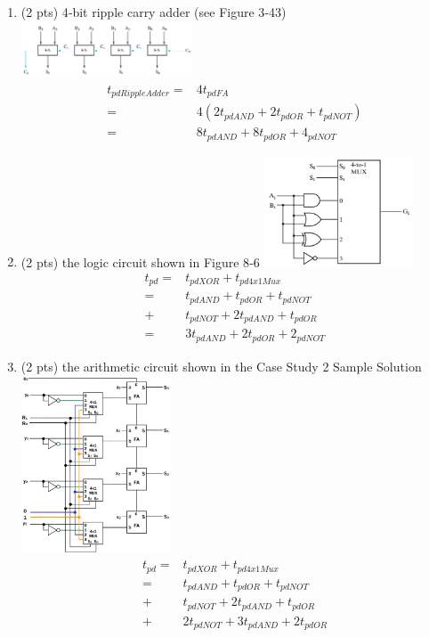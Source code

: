 \documentclass[12pt,letterpaper,titlepage]{report}
\begin{document}
\begin{raggedright}
\begin{multicols}{2}
\begin{enumerate} [label=\alph*)]
\item (2 pts) 4‐bit ripple carry adder (see Figure 3‐43) 
\includegraphics[width=0.4\textwidth,height=0.9\textheight,keepaspectratio=true]{hw8p1c}
\begin{align*}
t_{pdRippleAdder}=& 4t_{pdFA}
               \\=& 4(2t_{pdAND}+2t_{pdOR}+t_{pdNOT})
               \\=& 8t_{pdAND}+8t_{pdOR}+4_{pdNOT}
\end{align*}
\columnbreak

\item (2 pts) the logic circuit shown in Figure 8‐6 
\includegraphics[width=0.35\textwidth,height=0.9\textheight,keepaspectratio=true]{hw8p1d}
\begin{align*}
t_{pd}=& t_{pdXOR}+t_{pd4x1Mux}
    \\=& t_{pdAND}+t_{pdOR}+t_{pdNOT}
    \\+& t_{pdNOT}+2t_{pdAND}+t_{pdOR}
    \\=& 3t_{pdAND}+2t_{pdOR}+2_{pdNOT}
\end{align*}

\item (2 pts) the arithmetic circuit shown in the Case Study 2 Sample Solution
\includegraphics[width=0.35\textwidth,height=0.9\textheight,keepaspectratio=true]{hw8p1e}
\begin{align*}
t_{pd}=& t_{pdXOR}+t_{pd4x1Mux}
    \\=& t_{pdAND}+t_{pdOR}+t_{pdNOT}
    \\+& t_{pdNOT}+2t_{pdAND}+t_{pdOR}
    \\+& 2t_{pdNOT}+3t_{pdAND}+2t_{pdOR}
\end{align*}


\end{enumerate}
\end{multicols}
\end{raggedright}
\end{document}
